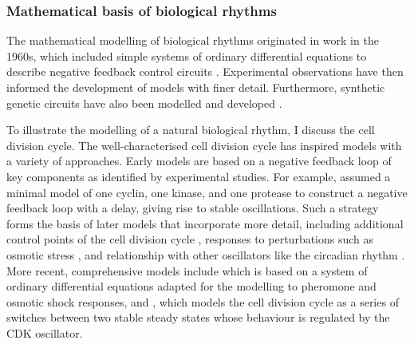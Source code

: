 \subsubsection{Mathematical basis of biological rhythms}
\label{subsubsec:intro-ymc-biological_rhythms-theoretical_basis}

The mathematical modelling of biological rhythms originated in work in the 1960s, which included simple systems of ordinary differential equations to describe negative feedback control circuits \parencite{goodwinOscillatoryBehaviorEnzymatic1965, griffithMathematicsCellularControl1968}.
Experimental observations have then informed the development of models with finer detail.
Furthermore, synthetic genetic circuits have also been modelled and developed \parencite{elowitzSyntheticOscillatoryNetwork2000}.

To illustrate the modelling of a natural biological rhythm, I discuss the cell division cycle.
The well-characterised cell division cycle has inspired models with a variety of approaches.
Early models are based on a negative feedback loop of key components as identified by experimental studies.
For example, \textcite{goldbeterMinimalCascadeModel1991} assumed a minimal model of one cyclin, one kinase, and one protease to construct a negative feedback loop with a delay, giving rise to stable oscillations.
Such a strategy forms the basis of later models that incorporate more detail, including additional control points of the cell division cycle \parencite{chenIntegrativeAnalysisCell2004}, responses to perturbations such as osmotic stress \parencite{adroverTimeDependentQuantitativeMulticomponent2011}, and relationship with other oscillators like the circadian rhythm \parencite{gerardEntrainmentMammalianCell2012, charvinForcedPeriodicExpression2009, droinLowdimensionalDynamicsTwo2019}.
More recent, comprehensive models include \textcite{adlerYeastCellCycle2022} which is based on a system of ordinary differential equations adapted for the modelling to pheromone and osmotic shock responses, and \textcite{novakMitoticKinaseOscillation2022}, which models the cell division cycle as a series of switches between two stable steady states whose behaviour is regulated by the CDK oscillator.

